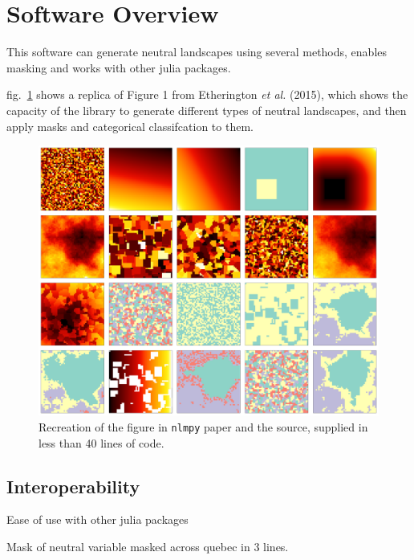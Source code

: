 \documentclass[11pt]{article}
\makeatletter
\def\maxwidth{\ifdim\Gin@nat@width>\linewidth\linewidth
\else\Gin@nat@width\fi}
\let\Oldincludegraphics\includegraphics
\renewcommand{\includegraphics}[1]{\Oldincludegraphics[width=\maxwidth]{#1}}
\makeatother
\begin{document}
\hypertarget{software-overview}{%
\section{Software Overview}\label{software-overview}}

This software can generate neutral landscapes using several methods,
enables masking and works with other julia packages.

fig.~\ref{fig:allmethods} shows a replica of Figure 1 from Etherington
\emph{et al.} (2015), which shows the capacity of the library to
generate different types of neutral landscapes, and then apply masks and
categorical classifcation to them.

\begin{figure}
\hypertarget{fig:allmethods}{%
\centering
\includegraphics{./figures/figure1.png}
\caption{Recreation of the figure in \texttt{nlmpy} paper and the
source, supplied in less than 40 lines of code.}\label{fig:allmethods}
}
\end{figure}

\hypertarget{interoperability}{%
\subsection{Interoperability}\label{interoperability}}

Ease of use with other julia packages

Mask of neutral variable masked across quebec in 3 lines.
\end{document}
